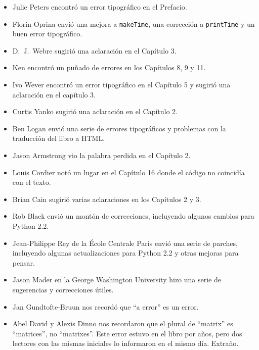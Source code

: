\documentclass[10pt]{book}
\begin{document}
\begin{itemize}
\item Julie Peters encontró un error tipográfico en el Prefacio.

\item Florin Oprina envió una mejora a {\tt makeTime},
una corrección a {\tt printTime} y un buen error tipográfico.

\item D.~J.~Webre sugirió una aclaración en el Capítulo 3.

\item Ken encontró un puñado de errores en los Capítulos 8, 9 y 11.

\item Ivo Wever encontró un error tipográfico en el Capítulo 5 y sugirió una aclaración
en el capítulo 3.

\item Curtis Yanko sugirió una aclaración en el Capítulo 2.

\item Ben Logan envió una serie de errores tipográficos y problemas con la traducción
del libro a HTML.

\item Jason Armstrong vio la palabra perdida en el Capítulo 2.

\item Louis Cordier notó un lugar en el Capítulo 16 donde el código
no coincidía con el texto.

\item Brian Cain sugirió varias aclaraciones en los Capítulos 2 y 3.

\item Rob Black envió un montón de correcciones, incluyendo algunos
cambios para Python 2.2.

\item Jean-Philippe Rey de la \'{E}cole Centrale
Paris envió una serie de parches, incluyendo algunas actualizaciones para Python 2.2
y otras mejoras para pensar.

\item Jason Mader en la George Washington University hizo una serie 
de sugerencias y correcciones útiles.

\item Jan Gundtofte-Bruun nos recordó que ``a error'' es un error.

\item Abel David y Alexis Dinno nos recordaron que el plural de
``matrix'' es ``matrices'', no ``matrixes''.  Este error estuvo en el
libro por años, pero dos lectores con las mismas iniciales lo informaron en
el mismo día. Extraño.


\end{itemize}
\end{document}
